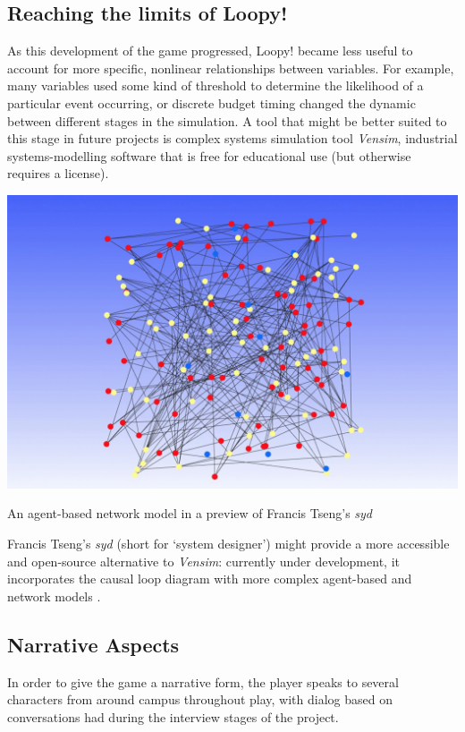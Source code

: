 \documentclass[nofonts,nols,justified,nobib]{tufte-book}
\begin{document}
\subsection*{Reaching the limits of Loopy!}

As this development of the game progressed, Loopy! became less useful to account for more specific, nonlinear relationships between variables. For example, many variables used some kind of threshold to determine the likelihood of a particular event occurring, or discrete budget timing changed the dynamic between different stages in the simulation. A tool that might be better suited to this stage in future projects is complex systems simulation tool \emph{Vensim}, industrial systems-modelling software that is free for educational use (but otherwise requires a license). 

\begin{marginfigure}
  \includegraphics[width=1\linewidth]{img/3/syd.png}
  \caption{An agent-based network model in a preview of Francis Tseng's \emph{syd} \cite{tseng_big_2016}}
\end{marginfigure}

Francis Tseng's \emph{syd} (short for `system designer') might provide a more accessible and open-source alternative to \emph{Vensim}: currently under development, it incorporates the causal loop diagram with more complex agent-based and network models \cite{tseng_big_2016}. 

\subsection*{Narrative Aspects}

In order to give the game a narrative form, the player speaks to several characters from around campus throughout play, with dialog based on conversations had during the interview stages of the project.
\end{document}
